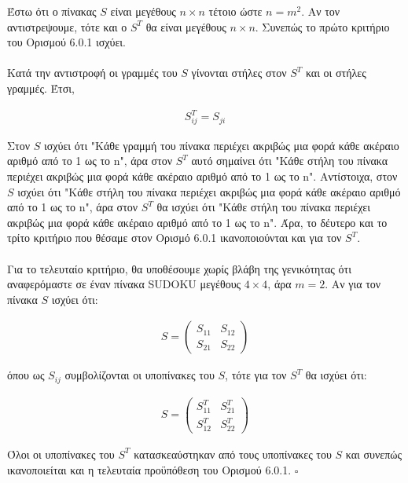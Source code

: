 \documentclass[12pt]{book}
\theoremstyle{definition}
\begin{document}
Έστω ότι ο πίνακας \(S\) είναι μεγέθους \(n \times n\) τέτοιο ώστε \(n = m^2\). Αν τον αντιστρεψουμε, τότε και ο \(S^{T}\) θα είναι μεγέθους \(n \times n\). Συνεπώς το πρώτο κριτήριο του Ορισμού 6.0.1 ισχύει. \\ \\

Κατά την αντιστροφή οι γραμμές του \(S\) γίνονται στήλες στον \(S^{T}\) και οι στήλες γραμμές. Έτσι,

\begin{align*}
	S^{T}_{ij} = S_{ji}
\end{align*}

Στον \(S\) ισχύει ότι "Κάθε γραμμή του πίνακα περιέχει ακριβώς μια φορά κάθε ακέραιο αριθμό από το 1 ως το n", άρα στον \(S^{T}\) αυτό σημαίνει ότι "Κάθε στήλη του πίνακα περιέχει ακριβώς μια φορά κάθε ακέραιο αριθμό από το 1 ως το n". Αντίστοιχα, στον \(S\) ισχύει ότι "Κάθε στήλη του πίνακα περιέχει ακριβώς μια φορά κάθε ακέραιο αριθμό από το 1 ως το n", άρα στον \(S^{T}\) θα ισχύει ότι "Κάθε στήλη του πίνακα περιέχει ακριβώς μια φορά κάθε ακέραιο αριθμό από το 1 ως το n". Άρα, το δέυτερο και το τρίτο κριτήριο που θέσαμε στον Ορισμό 6.0.1 ικανοποιούνται και για τον \(S^{T}\). \\ \\

Για το τελευταίο κριτήριο, θα υποθέσουμε χωρίς βλάβη της γενικότητας ότι αναφερόμαστε σε έναν πίνακα SUDOKU μεγέθους \(4 \times 4\), άρα \(m = 2\). Αν για τον πίνακα \(S\) ισχύει ότι:

\begin{align*}
	S = \begin{pmatrix}
		S_{11} & S_{12} \\
		S_{21} & S_{22}
	\end{pmatrix}
\end{align*}

όπου ως \(S_{ij}\) συμβολίζονται οι υποπίνακες του \(S\), τότε για τον \(S^{T}\) θα ισχύει ότι:

\begin{align*}
	S = \begin{pmatrix}
		S_{11}^{T} & S_{21}^{T} \\
		S_{12}^{T} & S_{22}^{T}
	\end{pmatrix}
\end{align*}

Όλοι οι υποπίνακες του \(S^{T}\) κατασκεαύστηκαν από τους υποπίνακες του \(S\) και συνεπώς ικανοποιείται και η τελευταία προϋπόθεση του Ορισμού 6.0.1. \(\square\)
\end{document}
